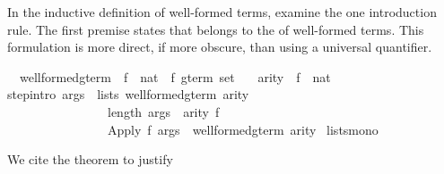 \begin{isabellebody}
\begin{isamarkuptext}
In the inductive definition of well-formed terms, examine the one
introduction rule.  The first premise states that  belongs to
the  of well-formed terms.  This formulation is more
direct, if more obscure, than using a universal quantifier.%
\end{isamarkuptext}%
\isamarkuptrue%
\isamarkupfalse%
\isanewline
\ \ well{}formed{}gterm{}\ {}{}\ {}{}{}f\ {}\ nat{}\ {}\ {}f\ gterm\ set{}\isanewline
\ \ \ arity\ {}{}\ {}{}f\ {}\ nat{}\isanewline
{}\isanewline
step{}intro{}{}{}\ {}{}args\ {}\ lists\ {}well{}formed{}gterm{}\ arity{}{}\ \ \isanewline
\ \ \ \ \ \ \ \ \ \ \ \ \ \ \ \ length\ args\ {}\ arity\ f{}\isanewline
\ \ \ \ \ \ \ \ \ \ \ \ \ \ \ {}\ {}Apply\ f\ args{}\ {}\ well{}formed{}gterm{}\ arity{}\isanewline
{}\ lists{}mono%
\begin{isamarkuptext}%
We cite the theorem  to justify 

\end{isamarkuptext}
\end{isabellebody}
